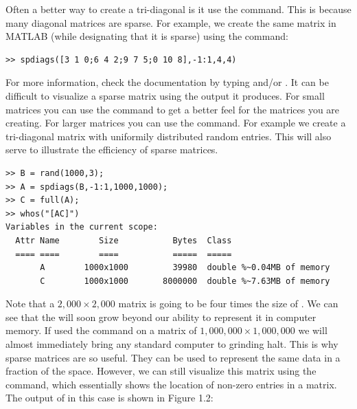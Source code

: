 Often a better way to create a tri-diagonal is it use the 
command. This is because many diagonal matrices are sparse. For example, we create the same matrix in MATLAB (while designating that it is sparse) using the command:
\begin{lstlisting}[style=matlab]
>> spdiags([3 1 0;6 4 2;9 7 5;0 10 8],-1:1,4,4)
\end{lstlisting}
For more information, check the documentation by typing  and/or
. It can be difficult to visualize a sparse matrix
using the output it produces. For small matrices you can use the  command to get a better feel for the matrices you are creating. For larger matrices you can use the  command. For example we create a tri-diagonal matrix with uniformily distributed random entries.  This will also serve to illustrate the efficiency of sparse matrices.

\begin{lstlisting}[style=matlab]
>> B = rand(1000,3);
>> A = spdiags(B,-1:1,1000,1000);
>> C = full(A);
>> whos("[AC]")
Variables in the current scope:
  Attr Name        Size           Bytes  Class
  ==== ====        ====           =====  ===== 
       A        1000x1000         39980  double %~0.04MB of memory
       C        1000x1000       8000000  double %~7.63MB of memory
\end{lstlisting}

Note that a $2,\!000 \times 2,\!000$ matrix is going to be four times the size of .  We can see that the  will soon grow beyond our ability to represent it in computer memory.  If used the  command on a matrix of $1,\!000,\!000 \times 1,\!000,\!000$ we will almost immediately bring any standard computer to grinding halt.  This is why sparse matrices are so useful.  They can be used to represent the same data in a fraction of the space. However, we can still visualize this matrix using the  command, which essentially shows the location of non-zero entries in a matrix. The output of  in this case is shown in Figure 1.2:

